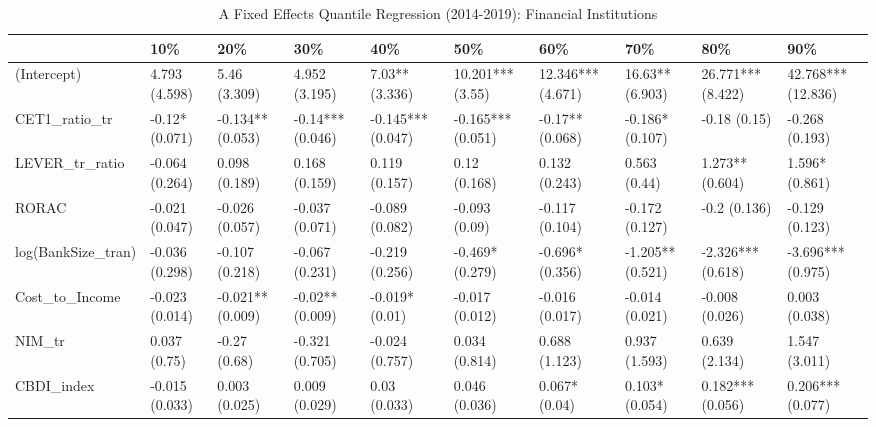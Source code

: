 \begin{table}[ht]
\centering
\caption{A Fixed Effects Quantile Regression (2014-2019): Financial Institutions} 
\begingroup\small
\begin{tabular}{llllllllll}
  \toprule
 & 10\% & 20\% & 30\% & 40\% & 50\% & 60\% & 70\% & 80\% & 90\% \\ 
  \midrule
(Intercept) & 4.793 (4.598) & 5.46 (3.309) & 4.952 (3.195) & 7.03** (3.336) & 10.201*** (3.55) & 12.346*** (4.671) & 16.63** (6.903) & 26.771*** (8.422) & 42.768*** (12.836) \\ 
  CET1\_ratio\_tr & -0.12* (0.071) & -0.134** (0.053) & -0.14*** (0.046) & -0.145*** (0.047) & -0.165*** (0.051) & -0.17** (0.068) & -0.186* (0.107) & -0.18 (0.15) & -0.268 (0.193) \\ 
  LEVER\_tr\_ratio & -0.064 (0.264) & 0.098 (0.189) & 0.168 (0.159) & 0.119 (0.157) & 0.12 (0.168) & 0.132 (0.243) & 0.563 (0.44) & 1.273** (0.604) & 1.596* (0.861) \\ 
  RORAC & -0.021 (0.047) & -0.026 (0.057) & -0.037 (0.071) & -0.089 (0.082) & -0.093 (0.09) & -0.117 (0.104) & -0.172 (0.127) & -0.2 (0.136) & -0.129 (0.123) \\ 
  log(BankSize\_tran) & -0.036 (0.298) & -0.107 (0.218) & -0.067 (0.231) & -0.219 (0.256) & -0.469* (0.279) & -0.696* (0.356) & -1.205** (0.521) & -2.326*** (0.618) & -3.696*** (0.975) \\ 
  Cost\_to\_Income & -0.023 (0.014) & -0.021** (0.009) & -0.02** (0.009) & -0.019* (0.01) & -0.017 (0.012) & -0.016 (0.017) & -0.014 (0.021) & -0.008 (0.026) & 0.003 (0.038) \\ 
  NIM\_tr & 0.037 (0.75) & -0.27 (0.68) & -0.321 (0.705) & -0.024 (0.757) & 0.034 (0.814) & 0.688 (1.123) & 0.937 (1.593) & 0.639 (2.134) & 1.547 (3.011) \\ 
  CBDI\_index & -0.015 (0.033) & 0.003 (0.025) & 0.009 (0.029) & 0.03 (0.033) & 0.046 (0.036) & 0.067* (0.04) & 0.103* (0.054) & 0.182*** (0.056) & 0.206*** (0.077) \\ 
   \bottomrule
\end{tabular}
\endgroup
\end{table}
